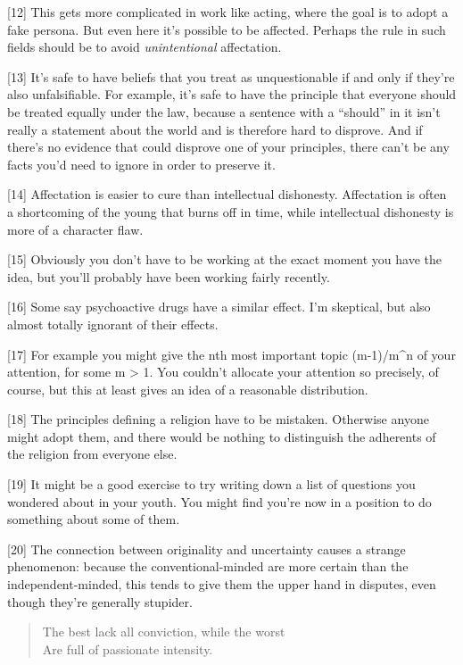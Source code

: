 {[}12{]} This gets more complicated in work like acting, where the goal
is to adopt a fake persona. But even here it's possible to be affected.
Perhaps the rule in such fields should be to avoid \emph{unintentional}
affectation.

{[}13{]} It's safe to have beliefs that you treat as unquestionable if
and only if they're also unfalsifiable. For example, it's safe to have
the principle that everyone should be treated equally under the law,
because a sentence with a ``should'' in it isn't really a statement
about the world and is therefore hard to disprove. And if there's no
evidence that could disprove one of your principles, there can't be any
facts you'd need to ignore in order to preserve it.

{[}14{]} Affectation is easier to cure than intellectual dishonesty.
Affectation is often a shortcoming of the young that burns off in time,
while intellectual dishonesty is more of a character flaw.

{[}15{]} Obviously you don't have to be working at the exact moment you
have the idea, but you'll probably have been working fairly recently.

{[}16{]} Some say psychoactive drugs have a similar effect. I'm
skeptical, but also almost totally ignorant of their effects.

{[}17{]} For example you might give the nth most important topic
(m-1)/m\^{}n of your attention, for some m \textgreater{} 1. You
couldn't allocate your attention so precisely, of course, but this at
least gives an idea of a reasonable distribution.

{[}18{]} The principles defining a religion have to be mistaken.
Otherwise anyone might adopt them, and there would be nothing to
distinguish the adherents of the religion from everyone else.

{[}19{]} It might be a good exercise to try writing down a list of
questions you wondered about in your youth. You might find you're now in
a position to do something about some of them.

{[}20{]} The connection between originality and uncertainty causes a
strange phenomenon: because the conventional-minded are more certain
than the independent-minded, this tends to give them the upper hand in
disputes, even though they're generally stupider.

\begin{quote}
The best lack all conviction, while the worst\\
Are full of passionate intensity.
\end{quote}

